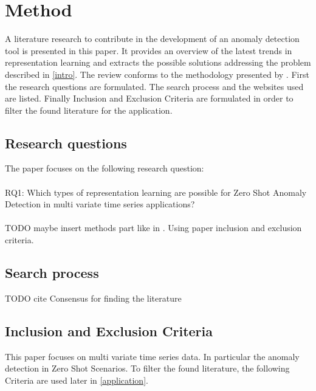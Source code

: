 \section{Method}\label{method}
A literature research to contribute in the development of an anomaly detection tool is presented in this paper. It provides an overview of the latest trends in representation learning and extracts the possible solutions addressing the problem described in \ref{intro}. The review conforms to the methodology presented by . First the research questions are formulated. The search process and the websites used are listed. Finally Inclusion and Exclusion Criteria are formulated in order to filter the found literature for the application.
\subsection{Research questions}
The paper focuses on the following research question:\\\\
RQ1: Which types of representation learning are possible for Zero Shot Anomaly Detection in multi variate time series applications?\\\\
TODO maybe insert methods part like in \cite{su_large_2024}. Using paper inclusion and exclusion criteria.
\subsection{Search process}
TODO cite Consensus for finding the literature
\subsection{Inclusion and Exclusion Criteria}
This paper focuses on multi variate time series data. In particular the anomaly detection in Zero Shot Scenarios. To filter the found literature, the following Criteria are used later in \ref{application}.

